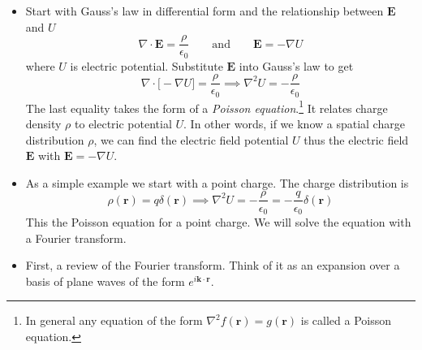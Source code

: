 \documentclass[11pt, a4paper]{article}
\newcommand{\eqtext}[1]{\qquad \text{#1} \qquad}
\renewcommand{\vec}[1]{\bm{#1}} %
\renewcommand{\r}{\vec{r}}
\newcommand{\E}{\vec{E}} %
\renewcommand{\div}{\nabla \cdot}
\renewcommand{\grad}{\nabla}
\begin{document}
\begin{itemize}
	\item Start with Gauss's law in differential form and the relationship between $ \E $ and $ U $
	\begin{equation*}
		\div \vec{E} = \frac{\rho}{\epsilon_{0}} \eqtext{and} \vec{E} = - \grad U
	\end{equation*}
	where $ U $ is electric potential. Substitute $ \E $ into Gauss's law to get
	\begin{equation*}
		\div \big[-\grad U\big] = \frac{\rho}{\epsilon_{0}} \implies \nabla^{2}U = -\frac{\rho}{\epsilon_{0}}
	\end{equation*}
	The last equality takes the form of a \textit{Poisson equation}.\footnote{In general any equation of the form $ \nabla^{2}f(\r) = g(\r) $ is called a Poisson equation.} It relates charge density $ \rho $ to electric potential $ U $. In other words, if we know a spatial charge distribution $ \rho $, we can find the electric field potential $ U $ thus the electric field $ \vec{E} $ with $ \E = - \grad U $.
	
	\item As a simple example we start with a point charge. The charge distribution is
	\begin{equation*}
		\rho(\vec{r}) = q \delta(\vec{r}) \implies \nabla^{2}U = -\frac{\rho}{\epsilon_{0}} = - \frac{q}{\epsilon_{0}}\delta(\r)
	\end{equation*}
	This the Poisson equation for a point charge. We will solve the equation with a Fourier transform.
	
	\item First, a review of the Fourier transform. Think of it as an expansion over a basis of plane waves of the form $ e^{i \vec{k} \cdot \r} $. 
	

\end{itemize}
\end{document}
